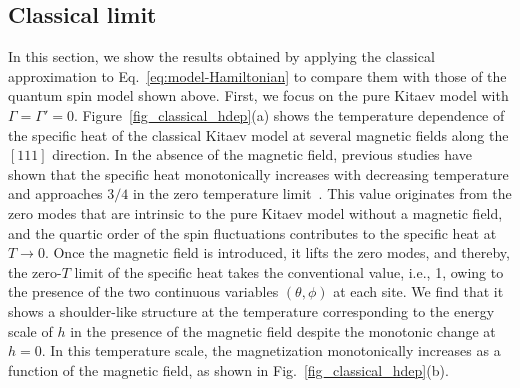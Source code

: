 \documentclass[twocolumn,superscriptaddress,showpacs, longbibliography, aps, prb]{revtex4-2}
\newcommand{\orange}[1]{\textcolor{orange}{#1}}
\begin{document}
\clearpage
 \subsection{Classical limit}
\label{sec:classicalMC}

In this section, we show the results obtained by applying the classical approximation %
to Eq.~\eqref{eq:model-Hamiltonian} to compare %
them with those of %
the quantum spin model shown above.
First, we focus on the pure Kitaev model with $\Gamma=\Gamma'=0$.
Figure~\ref{fig_classical_hdep}(a) shows the temperature dependence of the specific heat of the classical Kitaev model at several magnetic fields along the $[111]$ direction.
In the absence of the magnetic field, %
previous studies %
have shown that the specific heat monotonically increases with decreasing temperature and approaches $3/4$ in the zero temperature limit~\cite{Sela2014,Suzuki2018_2}.
This value originates from the zero modes that are intrinsic to the pure Kitaev model without a magnetic field, and the quartic order of the spin fluctuations contributes to the specific heat at $T\to 0$.
Once the magnetic field is introduced, it lifts the zero modes, and thereby, the zero-$T$ limit of the specific heat takes the conventional value, i.e., 1, owing to the presence of the two continuous variables $(\theta,\phi)$ at each site.
We find that it shows a shoulder-like structure %
at the temperature corresponding to the energy scale of $h$ in the presence of the magnetic field despite the monotonic change at $h=0$.
In this temperature scale, the magnetization monotonically increases as a function of the magnetic field,
as shown in Fig.~\ref{fig_classical_hdep}(b).
\end{document}
